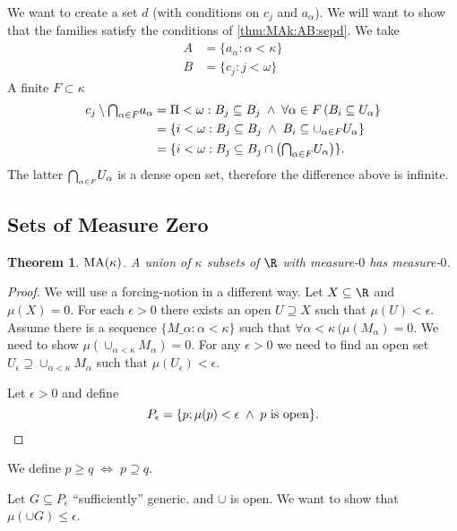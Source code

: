 \documentclass[11pt,pdftex,twoside,a4paper]{article}
\newcommand{\MA}{\ensuremath{\mathop{\rm MA}\nolimits}}
\newtheorem{thm}{Theorem}[section]
\begin{document}
We want to create a set $d$
(with conditions on \(c_j\) and \(a_\alpha\)).
We will want to show that the families satisfy 
the conditions of \ref{thm:MAk:AB:sepd}.
We take
\begin{align*}
A &= \{ a_\alpha: \alpha < \kappa\} \\
B &= \{c_j: j<\omega\}
\end{align*}
A finite \(F\subset  \kappa\)
\begin{align*}
c_j \setminus \mathsmaller{\bigcap_{\alpha\in F}} a_\alpha 
  &= \Pi<\omega: B_j \subseteq B_j\;\land\; 
    \forall \alpha\in F\,(B_i \subseteq U_\alpha\} \\
  &= \{i < \omega: B_j \subseteq B_j\;\land\;  
    B_i \subseteq \cup_{\alpha\in F} U_\alpha\} \\
  &= \{i < \omega: 
    B_j \subseteq B_j\cap
      \left(\mathsmaller{\bigcap_{\alpha\in F}} U_\alpha\right)\}.
\end{align*}
The latter \(\mathsmaller{\bigcap_{\alpha\in F}} U_\alpha\) is a dense open set,
therefore the difference above is infinite.

\subsection{Sets of Measure Zero}

\begin{thm}
\(\MA(\kappa)\).
A union of \(\kappa\) subsets of \(\R\) with measure-$0$
has measure-$0$.
\end{thm}
\begin{proof}
We will use a forcing-notion in a different way.
Let \(X\subseteq\R\) and \(\mu(X)=0\).
For each \(\epsilon>0\) there exists an open \(U\supseteq X\)
such that \(\mu(U)<\epsilon\).
Assume there is a sequence \(\{M\_\alpha: \alpha<\kappa\}\)
such that \(\forall \alpha<\kappa\,(\mu(M_\alpha)=0\).
We need to show \(\mu(\cup_{\alpha<\kappa}M_\alpha) = 0\).
For any \(\epsilon > 0\) we need to find an open set 
\(U_\epsilon \supseteq \cup_{\alpha<\kappa}M_\alpha\)
such that \(\mu(U_\epsilon)<\epsilon\).

Let \(\epsilon>0\) and define
\begin{equation*}
P_\epsilon = \{p; \mu(p)<\epsilon\;\land\;p\textnormal{ is open}\}.
\end{equation*}
\end{proof}
We define \(p \geq q \; \iff \; p \supseteq q\).

Let \(G \subseteq P_\epsilon\) ``sufficiently'' generic.
and \(\cup \) is open.
We want to show that \(\mu(\cup G) \leq \epsilon\).
\end{document}
